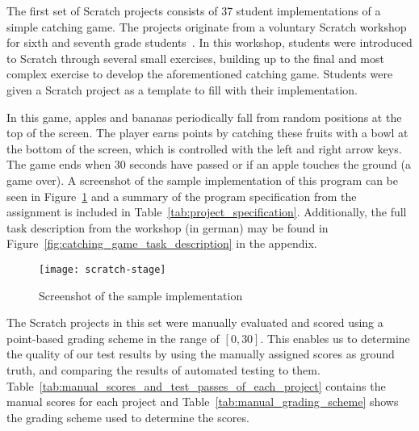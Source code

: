 The first set of Scratch projects consists of 37 student implementations of a simple catching game.
The projects originate from a voluntary Scratch workshop for sixth and seventh grade students~\cite{keller}.
In this workshop, students were introduced to Scratch through several small exercises,
building up to the final and most complex exercise to develop the aforementioned catching game.
Students were given a Scratch project as a template to fill with their implementation.
\parspace

In this game, apples and bananas periodically fall from random positions at the top of the screen.
The player earns points by catching these fruits with a bowl at the bottom of the screen,
which is controlled with the left and right arrow keys.
The game ends when 30 seconds have passed or if an apple touches the ground (a game over).
A screenshot of the sample implementation of this program can be seen in Figure~\ref{fig:screenshot_of_the_sample_implementation}
and a summary of the program specification from the assignment is included in Table~\ref{tab:project_specification}.
Additionally, the full task description from the workshop (in german) may be found in Figure~\ref{fig:catching_game_task_description} in the appendix.
\parspace

\begin{figure}[htpb]
    \centering
    \texttt{[image: scratch-stage]}
    \caption{Screenshot of the sample implementation}
    \label{fig:screenshot_of_the_sample_implementation}
\end{figure}

The Scratch projects in this set were manually evaluated and scored using a point-based grading scheme in the range of $[0, 30]$.
This enables us to determine the quality of our test results by using the manually assigned scores as ground truth,
and comparing the results of automated testing to them.
Table~\ref{tab:manual_scores_and_test_passes_of_each_project} contains the manual scores for each project and
Table~\ref{tab:manual_grading_scheme} shows the grading scheme used to determine the scores.
\parspace

